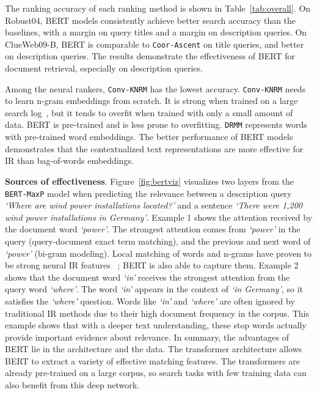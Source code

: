 \documentclass[sigconf]{acmart}
\begin{document}
The ranking accuracy of each ranking method is shown in Table~\ref{tab:overall}.  On Robust04,  BERT models consistently achieve better search accuracy than the baselines, with a  margin on query titles and a  margin on description queries. On ClueWeb09-B,  BERT is comparable to 
\texttt{Coor-Ascent} on title queries, and better on description queries. The results demonstrate the effectiveness of BERT for document retrieval, especially on description queries. 

Among the neural rankers, \texttt{Conv-KNRM} has the lowest accuracy. \texttt{Conv-KNRM} needs to learn n-gram embeddings from scratch. It is strong when 
trained on a large search log~\cite{dai2018convolutional}, but it tends to overfit when 
trained with only a small amount of data. BERT is pre-trained and is less prone to overfitting. \texttt{DRMM} represents words with pre-trained word embeddings. The better performance of BERT models demonstrates that the contextualized text representations are more effective for IR than bag-of-words embeddings. 

\textbf{Sources of effectiveness}. Figure~\ref{fig:bertviz} visualizes two layers from the \texttt{BERT-MaxP} model when predicting the relevance between a description query \textit{`Where are wind power installations located?'} and a sentence \textit{`There were 1,200 wind power installations in Germany'}. Example 1 shows the attention received by the document word \textit{`power'}. The strongest attention comes from \textit{`power'} in the query (query-document exact term matching), and the previous and next word of \textit{`power'} (bi-gram modeling). 
Local matching of words and n-grams have proven to be strong neural IR features ~\cite{DRMM, dai2018convolutional}; BERT is also able to capture them.
Example 2 shows that the document word \textit{`in'} receives the strongest attention from the query word \textit{`where'}. The word \textit{`in'} appears in the context of \textit{`in Germany'}, so it satisfies the \textit{`where'} question. Words like \textit{`in'} and \textit{`where'} are often ignored by traditional IR methods due to their high document frequency in the corpus. This example shows that with a deeper text understanding, these stop words actually provide important evidence about relevance. 
In summary, the advantages of BERT lie in the architecture and the data. The transformer architecture allows BERT to extract a variety of effective matching features. The transformers are already pre-trained on a large corpus, so search tasks with few training data can also benefit from this deep network.
\end{document}

